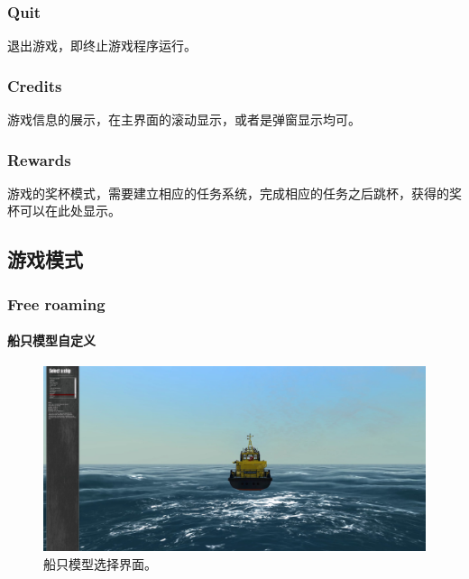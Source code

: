 \documentclass[letterpaper,10pt]{article}
\begin{document}
				\subsubsection{Quit}
				
				退出游戏，即终止游戏程序运行。
				
				\subsubsection{Credits}
				
				游戏信息的展示，在主界面的滚动显示，或者是弹窗显示均可。
				
				\subsubsection{Rewards}
	
				游戏的奖杯模式，需要建立相应的任务系统，完成相应的任务之后跳杯，获得的奖杯可以在此处显示。
	
			\subsection{游戏模式}
	
				\subsubsection{Free roaming}
				
				\paragraph{船只模型自定义}
				
				\begin{figure}[htbp]
					\centering 
					\includegraphics[width=\columnwidth]{picture/Select a ship}
					\caption{
						\label{fig: Select a ship} 
						船只模型选择界面。
					}	
				\end{figure}
	
\end{document}
